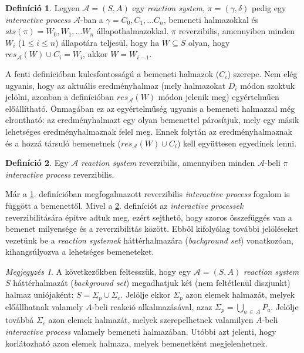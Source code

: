 \documentclass[12pt]{article}
\theoremstyle{definition}
\newtheorem{definition}{Definíció}
\theoremstyle{remark}
\newtheorem*{remark*}{Megjegyzés}
\theoremstyle{plain}
\theoremstyle{remark}
\theoremstyle{plain}
\newcommand{\res}{\textit{res}}
\begin{document}
    \begin{definition}\label{def:reversible-interactive-process}
        Legyen $\mathscr{A} = (S, A)$ egy \textit{reaction system}, $\pi=(\gamma, \delta)$ pedig egy \textit{interactive process} $\mathscr{A}$-ban a $\gamma = C_{0}, C_{1}, \ldots C_{n}$, bemeneti halmazokkal és $\textit{sts}(\pi)=W_{0},W_{1},\ldots W_{n}$ állapothalmazokkal. $\pi$ reverzibilis, amennyiben minden $W_{i}$ ($1 \leq i \leq n$) állapotára teljesül, hogy ha $W \subseteq S$ olyan, hogy $res_{\mathscr{A}}(W) \cup C_{i} = W_{i}$, akkor $W = W_{i - 1}$.
    \end{definition}

    A fenti definícióban kulcsfontosságú a bemeneti halmazok ($C_{i}$) szerepe. Nem elég ugyanis, hogy az aktuális eredményhalmaz (mely halmazokat $D_{i}$ módon szoktuk jelölni, azonban a definícióban $\res_{\mathscr{A}}(W)$ módon jelenik meg) egyértelműen előállítható. Önmagában ez az egyértelműség ugyanis a bemeneti halmazzal még elrontható: az eredményhalmazt egy olyan bemenettel párosítjuk, mely egy másik lehetséges eredményhalmaznak felel meg. Ennek folytán az eredményhalmaznak és a hozzá társuló bemenetnek ($\res_{\mathscr{A}}(W) \cup C_{i}$) kell együttesen egyedinek lenni.

    \begin{definition}\label{def:reversible-reaction-system}
        Egy $\mathscr{A}$ \textit{reaction system} reverzibilis, amennyiben minden $\mathscr{A}$-beli $\pi$ \textit{interactive process} reverzibilis.
    \end{definition}

    Már a \ref{def:reversible-interactive-process}. definícióban megfogalmazott reverzibilis \textit{interactive process} fogalom is függött a bemenettől. Mivel a \ref{def:reversible-reaction-system}. definíciót az \textit{interactive processek} reverzibilitására építve adtuk meg, ezért sejthető, hogy szoros összefüggés van a bemenet milyensége és a reverzibilitás között. Ebből kifolyólag további jelöléseket vezetünk be a \textit{reaction systemek} háttérhalmazára (\textit{background set}) vonatkozóan, kihangsúlyozva a lehetséges bemeneteket.

    \begin{remark*}
        A következőkben feltesszük, hogy egy $\mathscr{A} = (S, A)$ \textit{reaction system} $S$ háttérhalmazát (\textit{background set}) megadhatjuk két (nem feltétlenül diszjunkt) halmaz uniójaként: $S = \Sigma_{p} \cup \Sigma_{c}$. Jelölje ekkor $\Sigma_{p}$ azon elemek halmazát, melyek előállhatnak valamely $A$-beli reakció alkalmazásával, azaz $\Sigma_{p} = \bigcup_{a \, \in \, A}P_{a}$. Jelölje továbbá $\Sigma_{c}$ azon elemek halmazát, melyek szerepelhetnek valamilyen $A$-beli \textit{interactive process} valamely bemeneti halmazában. Utóbbi azt jelenti, hogy korlátozható azon elemek halmaza, melyek bemenetként megjelenhetnek.
    \end{remark*}
\end{document}

